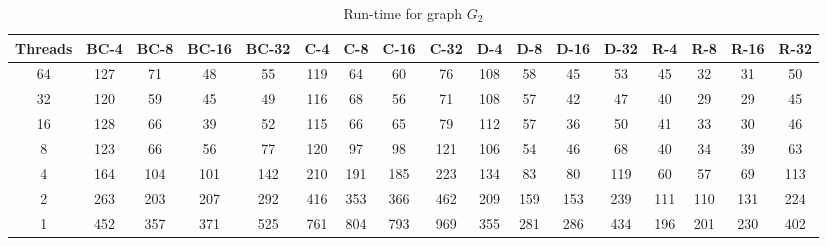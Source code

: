 \begin{table}[t]
\begin{minipage}[b]{\textwidth}
\caption{Run-time for graph $G_2$}
\label{tab:graph2}
{\small
\begin{tabular}{||c||c|c|c|c||c|c|c|c||c|c|c|c||c|c|c|c|}
\hline
\textbf{Threads}	&\cellcolor{black!10}BC-4&	\cellcolor{black!10}BC-8	&\cellcolor{black!10}BC-16	&\cellcolor{black!10}BC-32&	\cellcolor{black!10}C-4	&\cellcolor{black!10}C-8&	\cellcolor{black!10}C-16&	\cellcolor{black!10}C-32&	\cellcolor{black!10}D-4&	\cellcolor{black!10}D-8	&\cellcolor{black!10}D-16&\cellcolor{black!10}	D-32&	\cellcolor{black!10}R-4	&\cellcolor{black!10}R-8&	\cellcolor{black!10}R-16&	\cellcolor{black!10}R-32 \\ \hline \hline
64		&127	&71	&48	&55	&119	&64	&60	&76	&108	&58	&45	&53	&45	&32	&31	&50		 \\ \hline		
32		&120	&59	&45	&49	&116	&68	&56	&71	&108	&57	&42	&47	&40	&29	&29	&45		 \\ \hline			
16		&128	&66	&39	&52	&115	&66	&65	&79	&112	&57	&36	&50	&41	&33	&30	&46 \\ \hline				
8		&123	&66	&56	&77	&120	&97	&98	&121	&106	&54	&46	&68	&40	&34	&39	&63	 \\ \hline			
4		&164	&104	&101	&142	&210	&191	&185	&223	&134	&83	&80	&119	&60	&57	&69	&113	 \\ \hline			
2		&263	&203	&207	&292	&416	&353	&366	&462	&209	&159	&153	&239	&111	&110	&131	&224	 \\ \hline		
1		&452&357	&371	&525	&761	&804	&793	&969	&355	&281	&286	&434	&196	&201	&230	&402 \\ \hline		
\end{tabular}
}
\end{minipage}
\end{table}

